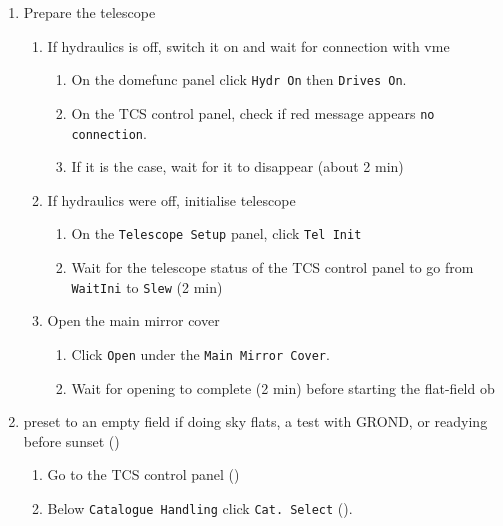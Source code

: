 \documentclass[11pt,fleqn,a4paper]{book}
\begin{document}
\label{proc:ready}
\begin{enumerate}
\item Prepare the telescope
         \begin{enumerate}
            \item If hydraulics is off, switch it on and wait for connection with \gls{vme} 
                \begin{enumerate}
                    \item On the \gls{domefunc} panel click \texttt{Hydr On} then \texttt{Drives On}.
                    \item On the \gls{TCS control panel}, check if red message appears  \texttt{no connection}.
                    \item If it is the case, wait for it to disappear (about 2 min)
                \end{enumerate}
            \item If hydraulics were off, initialise telescope
                \begin{enumerate}
                    \item On the \texttt{Telescope Setup} panel, click \texttt{Tel Init}
                    \item Wait for the telescope status of  the \gls{TCS control panel} to go from \texttt{WaitIni} to \texttt{Slew} (2 min)
                \end{enumerate}
	\item\label{list:mirropen}Open the \gls{main mirror} cover
            \begin{enumerate}
               \item Click \texttt{Open} under the \texttt{Main Mirror Cover}.
               \item Wait for opening to complete (2 min) before starting the flat-field \gls{ob}
            \end{enumerate}
        \end{enumerate}
        \item \Gls{preset} to an empty field if doing \gls{sky flats}, a test with GROND, or readying before sunset ()
               \label{list:presetempty}         
            \begin{enumerate}
            \item Go to the \gls{TCS control panel} () 
            \item Below \texttt{Catalogue Handling} click \texttt{Cat. Select} ().

\end{enumerate}
\end{enumerate}
\end{document}
